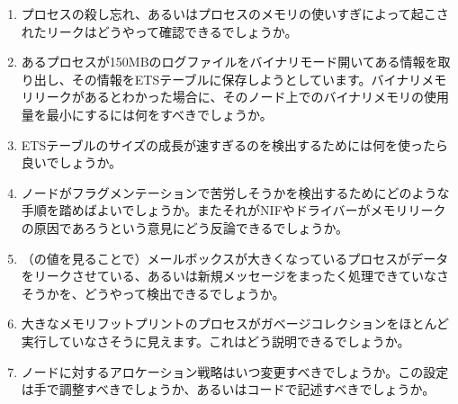 \begin{enumerate}
  \item プロセスの殺し忘れ、あるいはプロセスのメモリの使いすぎによって起こされたリークはどうやって確認できるでしょうか。
  \item あるプロセスが150MBのログファイルをバイナリモード開いてある情報を取り出し、その情報をETSテーブルに保存しようとしています。バイナリメモリリークがあるとわかった場合に、そのノード上でのバイナリメモリの使用量を最小にするには何をすべきでしょうか。
  \item ETSテーブルのサイズの成長が速すぎるのを検出するためには何を使ったら良いでしょうか。
  \item ノードがフラグメンテーションで苦労しそうかを検出するためにどのような手順を踏めばよいでしょうか。またそれがNIFやドライバーがメモリリークの原因であろうという意見にどう反論できるでしょうか。
  \item （の値を見ることで）メールボックスが大きくなっているプロセスがデータをリークさせている、あるいは新規メッセージをまったく処理できていなさそうかを、どうやって検出できるでしょうか。
  \item 大きなメモリフットプリントのプロセスがガベージコレクションをほとんど実行していなさそうに見えます。これはどう説明できるでしょうか。
  \item ノードに対するアロケーション戦略はいつ変更すべきでしょうか。この設定は手で調整すべきでしょうか、あるいはコードで記述すべきでしょうか。
\end{enumerate}

